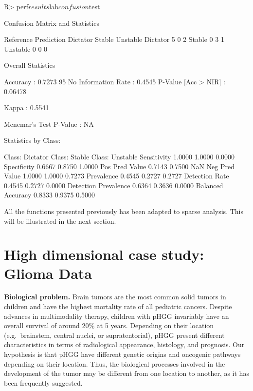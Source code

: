 \documentclass[
]{jss}
\begin{document}
\footnotesize

\begin{CodeChunk}
\begin{CodeInput}
R> perf$results$lab$confusion$test
\end{CodeInput}
\begin{CodeOutput}
Confusion Matrix and Statistics

          Reference
Prediction Dictator Stable Unstable
  Dictator        5      0        2
  Stable          0      3        1
  Unstable        0      0        0

Overall Statistics
                                          
               Accuracy : 0.7273          
                 95%
    No Information Rate : 0.4545          
    P-Value [Acc > NIR] : 0.06478         
                                          
                  Kappa : 0.5541          
                                          
 Mcnemar's Test P-Value : NA              

Statistics by Class:

                     Class: Dictator Class: Stable Class: Unstable
Sensitivity                   1.0000        1.0000          0.0000
Specificity                   0.6667        0.8750          1.0000
Pos Pred Value                0.7143        0.7500             NaN
Neg Pred Value                1.0000        1.0000          0.7273
Prevalence                    0.4545        0.2727          0.2727
Detection Rate                0.4545        0.2727          0.0000
Detection Prevalence          0.6364        0.3636          0.0000
Balanced Accuracy             0.8333        0.9375          0.5000
\end{CodeOutput}
\end{CodeChunk}

\normalsize

All the functions presented previously has been adapted to sparse
analysis. This will be illustrated in the next section.

\hypertarget{high-dimensional-case-study-glioma-data}{%
\section{High dimensional case study: Glioma
Data}\label{high-dimensional-case-study-glioma-data}}

\textbf{Biological problem.} Brain tumors are the most common solid
tumors in children and have the highest mortality rate of all pediatric
cancers. Despite advances in multimodality therapy, children with pHGG
invariably have an overall survival of around 20\% at 5 years. Depending
on their location (e.g.~brainstem, central nuclei, or supratentorial),
pHGG present different characteristics in terms of radiological
appearance, histology, and prognosis. Our hypothesis is that pHGG have
different genetic origins and oncogenic pathways depending on their
location. Thus, the biological processes involved in the development of
the tumor may be different from one location to another, as it has been
frequently suggested.
\end{document}
